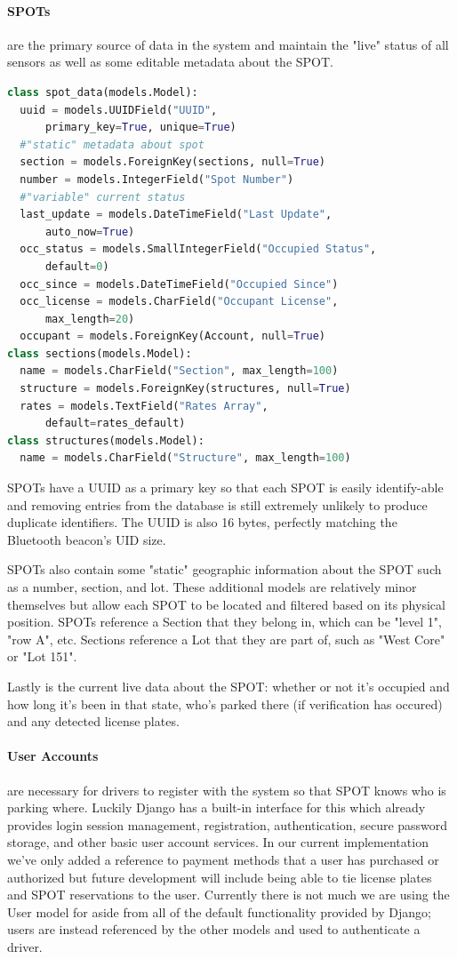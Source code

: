 \paragraph{SPOTs}
are the primary source of data in the system and maintain the "live" status of all sensors as well as some editable metadata about the SPOT.
\begin{lstlisting}[language=Python]
class spot_data(models.Model):
  uuid = models.UUIDField("UUID", 
      primary_key=True, unique=True)
  #"static" metadata about spot
  section = models.ForeignKey(sections, null=True)
  number = models.IntegerField("Spot Number")
  #"variable" current status
  last_update = models.DateTimeField("Last Update", 
      auto_now=True)
  occ_status = models.SmallIntegerField("Occupied Status", 
      default=0)
  occ_since = models.DateTimeField("Occupied Since")
  occ_license = models.CharField("Occupant License", 
      max_length=20)
  occupant = models.ForeignKey(Account, null=True)
class sections(models.Model):
  name = models.CharField("Section", max_length=100)
  structure = models.ForeignKey(structures, null=True)
  rates = models.TextField("Rates Array", 
      default=rates_default)
class structures(models.Model):
  name = models.CharField("Structure", max_length=100)
\end{lstlisting}
SPOTs have a UUID as a primary key so that each SPOT is easily identify-able and removing entries from the database is still extremely unlikely to produce duplicate identifiers.
The UUID is also 16 bytes, perfectly matching the Bluetooth beacon's UID size.  

SPOTs also contain some "static" geographic information about the SPOT such as a number, section, and lot.
These additional models are relatively minor themselves but allow each SPOT to be located and filtered based on its physical position.
SPOTs reference a Section that they belong in, which can be "level 1", "row A", etc.
Sections reference a Lot that they are part of, such as "West Core" or "Lot 151".

Lastly is the current live data about the SPOT: whether or not it's occupied and how long it's been in that state, who's parked there (if verification has occured) and any detected license plates.

\paragraph{User Accounts}
are necessary for drivers to register with the system so that SPOT knows who is parking where.
Luckily Django has a built-in interface for this which already provides login session management, registration, authentication, secure password storage, and other basic user account services.
In our current implementation we've only added a reference to payment methods that a user has purchased or authorized but future development will include being able to tie license plates and SPOT reservations to the user.
Currently there is not much we are using the User model for aside from all of the default functionality provided by Django; users are instead referenced by the other models and used to authenticate a driver.

